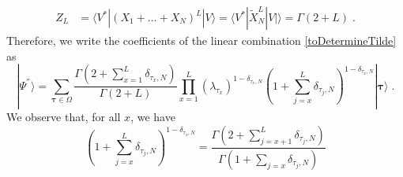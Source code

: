 \documentclass[10pt]{article}
\numberwithin{equation}{section}
\numberwithin{equation}{subsection}
\newcommand{\dt}{\;.}
\begin{document}
\begin{align*}
	Z_{L}&=\langle V^{*}|(X_{1}+\ldots+X_{N})^{L}|V\rangle=\langle V^{*}|\widetilde{X}_{N}^{L}|V|\rangle=
	\Gamma(2+L)\dt
\end{align*}
Therefore, we write the coefficients of the linear combination \eqref{toDetermineTilde} as 
\begin{equation}\label{resulEsteady}
	|\Psi^{''}\rangle= \sum_{\bm{\tau}\in \Omega}\frac{\Gamma(2+\sum_{x=1}^{L}\delta_{\tau_{x},N})}{\Gamma(2+L)}\prod_{x=1}^{L}\left(\lambda_{\tau_{x}}\right)^{1-\delta_{\tau_{x},N}}\left(1+\sum_{j=x}^{L}\delta_{\tau_{j},N}\right)^{1-\delta_{\tau_{x},N}}|\bm{\tau}\rangle\dt
\end{equation}
We observe that, for all $x$, we have
\begin{equation}
	\left(1+\sum_{j=x}^{L}\delta_{\tau_{j},N}\right)^{1-\delta_{\tau_{x},N}}=\frac{\Gamma(2+\sum_{j=x+1}^{L}\delta_{\tau_{j},N})}{\Gamma(1+\sum_{j=x}\delta_{\tau_{j},N})}
\end{equation}
\begin{comment}
Using the notation $\tau_{x}$, $|\bm{\tau}\rangle $ with $\bm{\tau}$, related to the one with $\bm{n}$ by \eqref{notation-change-relation}, we have 
\begin{equation}
	\prod_{a=1}^{N-1}\left(\lambda_{a}\right)^{n_{a}^{x}}\left(1+\sum_{j=x}^{L}n_{N}^{j}\right)^{n_{a}^{x}}=\left[\lambda_{\tau_{x}}\left(1+\sum_{j=x}^{L}\delta_{\tau_{j},N}\right)\right]^{1-\delta_{\tau_{x},N}}
\end{equation}
and 
\begin{equation}
	\frac{\Gamma(2+\sum_{i=1}^{L}n_{N}^{i})}{\Gamma(2+L)}=\frac{\Gamma\left(2+\sum_{x=1}^{L}\delta_{\tau_{x},N}\right)}{\Gamma\left(2+L\right)}\dt
\end{equation}
Therefore we obtain
\begin{equation}
|\Psi^{''}\rangle=\sum_{\tau_{1},\ldots,\tau_{L}=1}^{N}\frac{\Gamma\left(2+\sum_{x=1}^{L}\delta_{\tau_{x},N}\right)}{\Gamma\left(2+L\right)}\prod_{x=1}^{L}\left[\lambda_{\tau_{x}}\left(1+\sum_{j=x}^{L}\delta_{\tau_{j},N}\right)\right]^{1-\delta_{\tau_{x},N}}|\mathbf{\bm{\tau}}\rangle\dt
\end{equation}

\end{comment}
\end{document}
